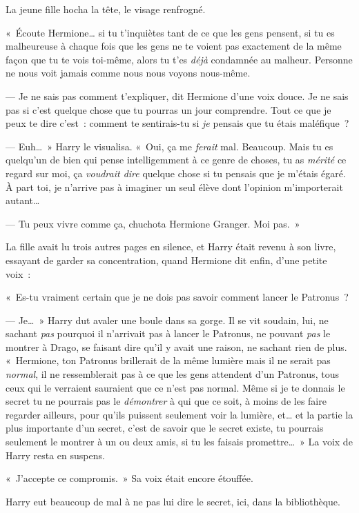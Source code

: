 La jeune fille hocha la tête, le visage renfrogné.

«~Écoute Hermione… si tu t'inquiètes tant de ce que les gens pensent, si tu es malheureuse à chaque fois que les gens ne te voient pas exactement de la même façon que tu te vois toi-même, alors tu t'es \emph{déjà} condamnée au malheur. Personne ne nous voit jamais comme nous nous voyons nous-même.

--- Je ne sais pas comment t'expliquer, dit Hermione d'une voix douce. Je ne sais pas si c'est quelque chose que tu pourras un jour comprendre. Tout ce que je peux te dire c'est~: comment te sentirais-tu si \emph{je} pensais que tu étais maléfique~?

--- Euh…~» Harry le visualisa. «~Oui, ça me \emph{ferait} mal. Beaucoup. Mais tu es quelqu'un de bien qui pense intelligemment à ce genre de choses, tu as \emph{mérité} ce regard sur moi, ça \emph{voudrait dire} quelque chose si tu pensais que je m'étais égaré. À part toi, je n'arrive pas à imaginer un seul élève dont l'opinion m'importerait autant…

--- Tu peux vivre comme ça, chuchota Hermione Granger. Moi pas.~»

La fille avait lu trois autres pages en silence, et Harry était revenu à son livre, essayant de garder sa concentration, quand Hermione dit enfin, d'une petite voix~:

«~Es-tu vraiment certain que je ne dois pas savoir comment lancer le Patronus~?

--- Je…~» Harry dut avaler une boule dans sa gorge. Il se vit soudain, lui, ne sachant \emph{pas} pourquoi il n'arrivait pas à lancer le Patronus, ne pouvant \emph{pas} le montrer à Drago, se faisant dire qu'il y avait une raison, ne sachant rien de plus. «~Hermione, ton Patronus brillerait de la même lumière mais il ne serait pas \emph{normal}, il ne ressemblerait pas à ce que les gens attendent d'un Patronus, tous ceux qui le verraient sauraient que ce n'est pas normal. Même si je te donnais le secret tu ne pourrais pas le \emph{démontrer} à qui que ce soit, à moins de les faire regarder ailleurs, pour qu'ils puissent seulement voir la lumière, et… et la partie la plus importante d'un secret, c'est de savoir que le secret existe, tu pourrais seulement le montrer à un ou deux amis, si tu les faisais promettre…~» La voix de Harry resta en suspens.

«~J'accepte ce compromis.~» Sa voix était encore étouffée.

Harry eut beaucoup de mal à ne pas lui dire le secret, ici, dans la bibliothèque.

